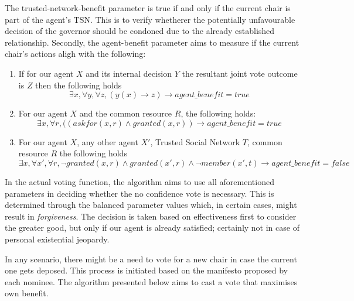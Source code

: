 The trusted-network-benefit parameter is true if and only if the current chair is part of the agent's TSN. This is to verify whetherer the potentially unfavourable decision of the governor should be condoned due to the already established relationship. Secondly, the agent-benefit parameter aims to measure if the current chair's actions aligh with the following:

\begin{enumerate}
    \item If for our agent $X$ and its internal decision $Y$ the resultant joint vote outcome is $Z$ then the following holds
    \begin{equation}
        \exists x, \forall y, \forall z, (y(x) \rightarrow z) \rightarrow agent\_benefit = true
    \end{equation}
    
    \item For our agent $X$ and the common resource $R$, the following holds:
    \begin{equation}
        \exists x, \forall r, ((askfor(x,r) \land granted(x,r)) \rightarrow agent\_benefit = true
    \end{equation}
    \item For our agent $X$, any other agent $X'$, Trusted Social Network $T$, common resource $R$ the following holds
    \begin{equation}
        \exists x, \forall x', \forall r, \neg granted(x,r) \land granted(x',r) \land \neg member(x',t) \rightarrow agent\_benefit = false
    \end{equation}
\end{enumerate}

In the actual voting function, the algorithm aims to use all aforementioned parameters in deciding whether the no confidence vote is necessary. This is determined through the balanced parameter values which, in certain cases, might result in \textit{forgiveness}. The decision is taken based on effectiveness first to consider the greater good, but only if our agent is already satisfied; certainly not in case of personal existential jeopardy.

In any scenario, there might be a need to vote for a new chair in case the current one gets deposed. This process is initiated based on the manifesto proposed by each nominee. The algorithm presented below aims to cast a vote that maximises own benefit.


